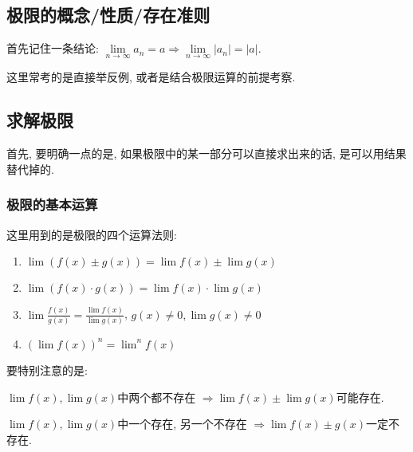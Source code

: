 \subsection{极限的概念/性质/存在准则}
首先记住一条结论: $ \lim\limits_{n \rightarrow \infty}a_{n}=a\Rightarrow \lim\limits_{n \rightarrow \infty}|a_{n}|=|a| $.\par
这里常考的是直接举反例, 或者是结合极限运算的前提考察.
\subsection{求解极限}
首先, 要明确一点的是, 如果极限中的某一部分可以直接求出来的话, 是可以用结果替代掉的.
\subsubsection{极限的基本运算}
这里用到的是极限的四个运算法则:
\begin{enumerate}
\item $ \lim\limits (f(x)\pm g(x))=\lim\limits f(x)\pm \lim\limits g(x) $
\item $ \lim\limits (f(x)\cdot g(x))=\lim\limits f(x)\cdot \lim\limits g(x) $
\item $ \lim\limits \frac{f(x)}{g(x)}=\frac{\lim\limits f(x)}{\lim\limits g(x)} $, $ g(x)\neq 0, \lim\limits g(x)\neq 0 $
\item $ (\lim\limits f(x))^{n}={\lim\limits}^{n}f(x) $
\end{enumerate}\par
\begin{tcolorbox}
要特别注意的是:\par
$ \lim\limits f(x), \lim\limits g(x) $中两个都不存在 $ \Rightarrow\lim\limits f(x)\pm \lim\limits g(x) $可能存在.\par
$ \lim\limits f(x), \lim\limits g(x) $中一个存在, 另一个不存在 $ \Rightarrow \lim\limits f(x)\pm g(x) $一定不存在.
\end{tcolorbox}
